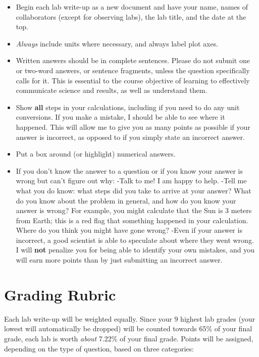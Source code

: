 \documentclass[10pt]{article}
\begin{document}
\begin{itemize}
\item Begin each lab write-up as a new document and have your name, names of collaborators (except for observing labs), the lab title, and the date at the top.
\item \textit{Always} include units where necessary, and always label plot axes.
\item Written answers should be in complete sentences. Please do not submit one or two-word answers, or sentence fragments, unless the question specifically calls for it. This is essential to the course objective of learning to effectively communicate science and results, as well as understand them.
\item Show \textbf{all} steps in your calculations, including if you need to do any unit conversions. If you make a mistake, I should be able to see where it happened. This will allow me to give you as many points as possible if your answer is incorrect, as opposed to if you simply state an incorrect answer.
\item Put a box around (or highlight) numerical answers.
\item If you don't know the answer to a question or if you know your answer is wrong but can't figure out why:
\subitem -Talk to me! I am happy to help.
\subitem -Tell me what you do know: what steps did you take to arrive at your answer? What do you know about the problem in general, and how do you know your answer is wrong? For example, you might calculate that the Sun is 3 meters from Earth; this is a red flag that something happened in your calculation. Where do you think you might have gone wrong? 
\subitem -Even if your answer is incorrect, a good scientist is able to speculate about where they went wrong. I will \textbf{not} penalize you for being able to identify your own mistakes, and you will earn more points than by just submitting an incorrect answer.   
\end{itemize}

\section*{Grading Rubric}

Each lab write-up will be weighted equally. Since your 9 highest lab grades (your lowest will automatically be dropped) will be counted towards 65\% of your final grade, each lab is worth \textit{about} 7.22\% of your final grade. Points will be assigned, depending on the type of question, based on three categories:
\end{document}
